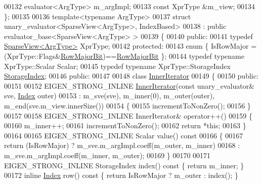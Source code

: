 \begin{DoxyCode}
00132     evaluator<ArgType> m\_argImpl;
00133     \textcolor{keyword}{const} XprType &m\_view;
00134 \};
00135 
00136 \textcolor{keyword}{template}<\textcolor{keyword}{typename} ArgType>
00137 \textcolor{keyword}{struct }unary\_evaluator<SparseView<ArgType>, IndexBased>
00138   : \textcolor{keyword}{public} evaluator\_base<SparseView<ArgType> >
00139 \{
00140   \textcolor{keyword}{public}:
00141     \textcolor{keyword}{typedef} \hyperlink{group___sparse_core___module_class_eigen_1_1_sparse_view}{SparseView<ArgType>} XprType;
00142   \textcolor{keyword}{protected}:
00143     \textcolor{keyword}{enum} \{ IsRowMajor = (XprType::Flags&\hyperlink{group__flags_gae4f56c2a60bbe4bd2e44c5b19cbe8762}{RowMajorBit})==\hyperlink{group__flags_gae4f56c2a60bbe4bd2e44c5b19cbe8762}{RowMajorBit} \};
00144     \textcolor{keyword}{typedef} \textcolor{keyword}{typename} XprType::Scalar Scalar;
00145     \textcolor{keyword}{typedef} \textcolor{keyword}{typename} XprType::StorageIndex \hyperlink{group___sparse_core___module_a0b540ba724726ebe953f8c0df06081ed}{StorageIndex};
00146   \textcolor{keyword}{public}:
00147     
00148     \textcolor{keyword}{class }\hyperlink{class_eigen_1_1_inner_iterator}{InnerIterator}
00149     \{
00150       \textcolor{keyword}{public}:
00151 
00152         EIGEN\_STRONG\_INLINE \hyperlink{class_eigen_1_1_inner_iterator}{InnerIterator}(\textcolor{keyword}{const} unary\_evaluator& sve, 
      \hyperlink{group___core___module_a554f30542cc2316add4b1ea0a492ff02}{Index} outer)
00153           : m\_sve(sve), m\_inner(0), m\_outer(outer), m\_end(sve.m\_view.innerSize())
00154         \{
00155           incrementToNonZero();
00156         \}
00157 
00158         EIGEN\_STRONG\_INLINE InnerIterator& operator++()
00159         \{
00160           m\_inner++;
00161           incrementToNonZero();
00162           \textcolor{keywordflow}{return} *\textcolor{keyword}{this};
00163         \}
00164 
00165         EIGEN\_STRONG\_INLINE Scalar value()\textcolor{keyword}{ const}
00166 \textcolor{keyword}{        }\{
00167           \textcolor{keywordflow}{return} (IsRowMajor) ? m\_sve.m\_argImpl.coeff(m\_outer, m\_inner)
00168                               : m\_sve.m\_argImpl.coeff(m\_inner, m\_outer);
00169         \}
00170 
00171         EIGEN\_STRONG\_INLINE StorageIndex index()\textcolor{keyword}{ const }\{ \textcolor{keywordflow}{return} m\_inner; \}
00172         \textcolor{keyword}{inline} \hyperlink{group___core___module_a554f30542cc2316add4b1ea0a492ff02}{Index} row()\textcolor{keyword}{ const }\{ \textcolor{keywordflow}{return} IsRowMajor ? m\_outer : index(); \}

\end{DoxyCode}
